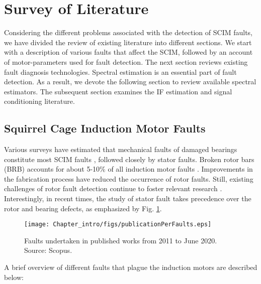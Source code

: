 \section{Survey of Literature}
Considering the different problems associated with the detection of SCIM faults, we have divided the review of existing literature into different sections. We start with a description of various faults that affect the SCIM, followed by an account of motor-parameters used for fault detection. The next section reviews existing fault diagnosis technologies. Spectral estimation is an essential part of fault detection. As a result, we devote the following section to review available spectral estimators. The subsequent section examines the IF estimation and signal conditioning literature. 

\subsection{Squirrel Cage Induction Motor Faults}
Various surveys have estimated that mechanical faults of damaged bearings constitute most SCIM faults \cite{Riera-Guasp2015}, followed closely by stator faults. Broken rotor bars (BRB) accounts for about 5-10\% of all induction motor faults \cite{Nandi2005}. Improvements in the fabrication process have reduced the occurrence of rotor faults. Still, existing challenges of rotor fault detection continue to foster relevant research \cite{Nandi2005}. Interestingly, in recent times, the study of stator fault takes precedence over the rotor and bearing defects, as emphasized by Fig. \ref{Fig:faults}.
\begin{figure}[h] \centering
	{\texttt{[image: Chapter\_intro/figs/publicationPerFaults.eps]}} \caption{Faults undertaken in published works from 2011 to June 2020. Source: Scopus.} \label{Fig:faults}
\end{figure}
A brief overview of different faults that plague the induction motors are described below:
%
